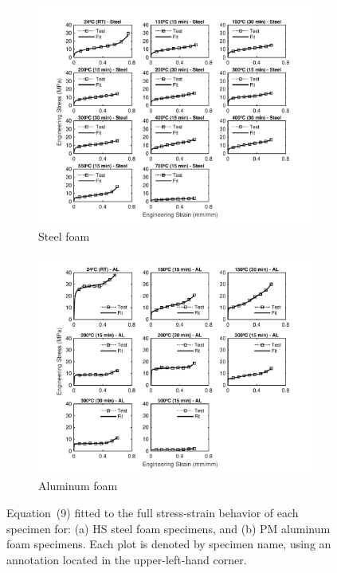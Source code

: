 \documentclass[review]{elsarticle}
\begin{document}
\begin{figure}
	\centering
	\begin{subfigure}{1.00\textwidth}
		\centering
		\includegraphics[width=0.90\linewidth]
		{Tex-Figures/Fig15a-StressStrain-fit-Fe.pdf}
		\caption{Steel foam}
		\label{fig:StressStrain_Rich_Steel}
	\end{subfigure}

	\par\bigskip %

	\begin{subfigure}{1.00\textwidth}
		\centering
		\includegraphics[width=0.70\linewidth]
		{Tex-Figures/Fig15b-StressStrain-fit-Al.pdf}
		\caption{Aluminum foam}
		\label{fig:StressStrain_Rich_Al}
	\end{subfigure}
	\caption{Equation~(9) fitted to the full stress-strain behavior of each specimen for: (a) HS steel foam specimens, and (b) PM aluminum foam specimens. Each plot is denoted by specimen name, using an annotation located in the upper-left-hand corner.}
	\label{fig:Stress_strain_fit}
\end{figure}
\end{document}

